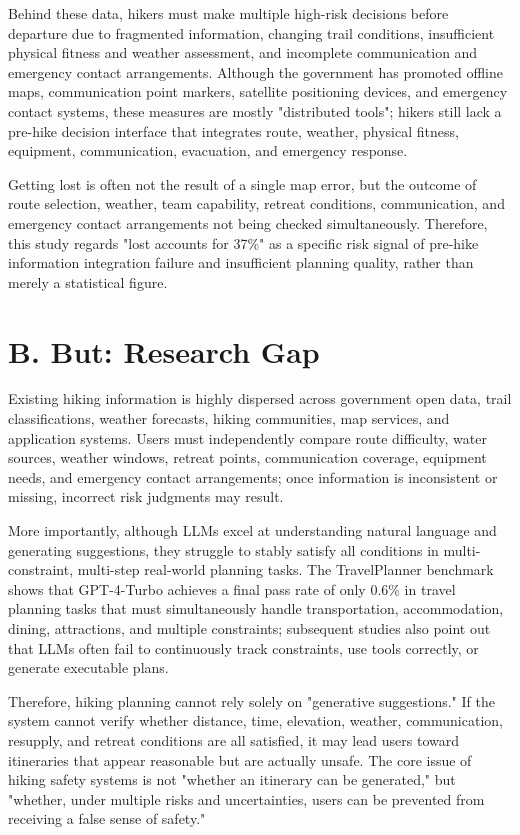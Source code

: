 \documentclass[conference]{IEEEtran}
\begin{document}
Behind these data, hikers must make multiple high-risk decisions before departure due to fragmented information, changing trail conditions, insufficient physical fitness and weather assessment, and incomplete communication and emergency contact arrangements. Although the government has promoted offline maps, communication point markers, satellite positioning devices, and emergency contact systems, these measures are mostly "distributed tools"; hikers still lack a pre-hike decision interface that integrates route, weather, physical fitness, equipment, communication, evacuation, and emergency response.

Getting lost is often not the result of a single map error, but the outcome of route selection, weather, team capability, retreat conditions, communication, and emergency contact arrangements not being checked simultaneously. Therefore, this study regards "lost accounts for 37\%" as a specific risk signal of pre-hike information integration failure and insufficient planning quality, rather than merely a statistical figure.

\section{B. But: Research Gap}

Existing hiking information is highly dispersed across government open data, trail classifications, weather forecasts, hiking communities, map services, and application systems. Users must independently compare route difficulty, water sources, weather windows, retreat points, communication coverage, equipment needs, and emergency contact arrangements; once information is inconsistent or missing, incorrect risk judgments may result.

More importantly, although LLMs excel at understanding natural language and generating suggestions, they struggle to stably satisfy all conditions in multi-constraint, multi-step real-world planning tasks. The TravelPlanner benchmark shows that GPT-4-Turbo achieves a final pass rate of only 0.6\% in travel planning tasks that must simultaneously handle transportation, accommodation, dining, attractions, and multiple constraints; subsequent studies also point out that LLMs often fail to continuously track constraints, use tools correctly, or generate executable plans.

Therefore, hiking planning cannot rely solely on "generative suggestions." If the system cannot verify whether distance, time, elevation, weather, communication, resupply, and retreat conditions are all satisfied, it may lead users toward itineraries that appear reasonable but are actually unsafe. The core issue of hiking safety systems is not "whether an itinerary can be generated," but "whether, under multiple risks and uncertainties, users can be prevented from receiving a false sense of safety."
\end{document}
